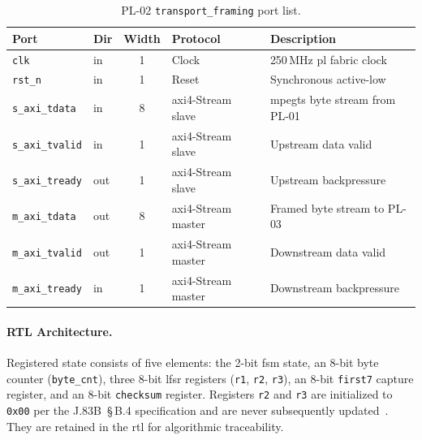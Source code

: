\begin{table}[htbp]
  \caption{PL-02 \texttt{transport\_framing} port list.}
  \label{tab:pl02_ports}
  \centering
  \small
  \begin{tabular}{llcll}
    \hline
    Port                    & Dir  & Width & Protocol                & Description \\
    \hline
    \texttt{clk}            & in   & 1     & Clock                   & 250\,MHz \ac{pl} fabric clock \\[2pt]
    \texttt{rst\_n}         & in   & 1     & Reset                   & Synchronous active-low \\[2pt]
    \texttt{s\_axi\_tdata}  & in   & 8     & \ac{axi}4-Stream slave  & \ac{mpegts} byte stream from PL-01 \\[2pt]
    \texttt{s\_axi\_tvalid} & in   & 1     & \ac{axi}4-Stream slave  & Upstream data valid \\[2pt]
    \texttt{s\_axi\_tready} & out  & 1     & \ac{axi}4-Stream slave  & Upstream backpressure \\[2pt]
    \texttt{m\_axi\_tdata}  & out  & 8     & \ac{axi}4-Stream master & Framed byte stream to PL-03 \\[2pt]
    \texttt{m\_axi\_tvalid} & out  & 1     & \ac{axi}4-Stream master & Downstream data valid \\[2pt]
    \texttt{m\_axi\_tready} & in   & 1     & \ac{axi}4-Stream master & Downstream backpressure \\
    \hline
  \end{tabular}
\end{table}


\FloatBarrier
\paragraph{RTL Architecture.}

Registered state consists of five elements: the 2-bit \ac{fsm} state,
an 8-bit byte counter (\texttt{byte\_cnt}), three 8-bit \ac{lfsr}
registers (\texttt{r1}, \texttt{r2}, \texttt{r3}), an 8-bit
\texttt{first7} capture register, and an 8-bit \texttt{checksum}
register.
Registers \texttt{r2} and \texttt{r3} are initialized to \texttt{0x00}
per the J.83B~\S\,B.4 specification and are never subsequently
updated~\cite{ITU_J83}. They are retained in the \ac{rtl} for
algorithmic traceability.

